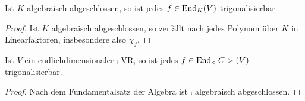 \begin{conclusion}
	Ist $K$ algebraisch abgeschlossen, so ist jedes $f\in\operatorname{End}_K(V)$ trigonalisierbar.
\end{conclusion}
\begin{proof}
	Ist $K$ algebraisch abgeschlossen, so zerfällt nach  jedes Polynom über $K$ in Linearfaktoren, insbesondere also $\chi_f$.
\end{proof}

\begin{conclusion}
	Ist $V$ ein endlichdimensionaler $\comp$-VR, so ist jedes $f\in\End_\comp(V)$ trigonalisierbar.
\end{conclusion}
\begin{proof}
	Nach dem Fundamentalsatz der Algebra  ist $\comp$ algebraisch abgeschlossen.
\end{proof}